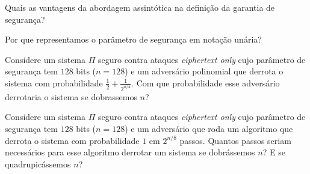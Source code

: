 \begin{exercicio}
  Quais as vantagens da abordagem assintótica na definição da garantia de segurança?
\end{exercicio}

\begin{exercicio}
  Por que representamos o parâmetro de segurança em notação unária?
\end{exercicio}

\begin{exercicio}
  Considere um sistema $\Pi$ seguro contra ataques {\em ciphertext only} cujo parâmetro de segurança tem $128$ bits ($n = 128$) e um adversário polinomial que derrota o sistema com probabilidade $\frac{1}{2} + \frac{1}{2^{n/4}}$.
Com que probabilidade esse adversário derrotaria o sistema se dobrassemos $n$?
\end{exercicio}

\begin{exercicio}
  Considere um sistema $\Pi$ seguro contra ataques {\em ciphertext only} cujo parâmetro de segurança tem $128$ bits ($n = 128$) e um adversário que roda um algoritmo que derrota o sistema com probabilidade $1$ em $2^{n/8}$ passos.
  Quantos passos seriam necessários para esse algoritmo derrotar um sistema se dobrássemos $n$? E se quadrupicássemos $n$?
\end{exercicio}
